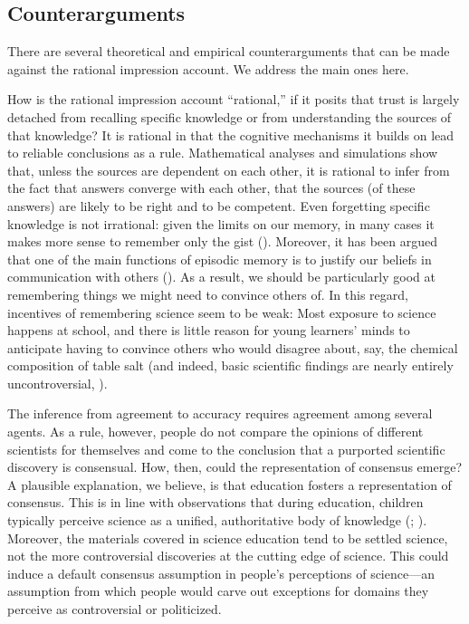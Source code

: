 \documentclass[
  jou,
  floatsintext,
  longtable,
  nolmodern,
  notxfonts,
  notimes,
  colorlinks=true,linkcolor=blue,citecolor=blue,urlcolor=blue]{apa7}
\begin{document}
\subsection{Counterarguments}\label{counterarguments}

There are several theoretical and empirical counterarguments that can be
made against the rational impression account. We address the main ones
here.

How is the rational impression account ``rational,'' if it posits that
trust is largely detached from recalling specific knowledge or from
understanding the sources of that knowledge? It is rational in that the
cognitive mechanisms it builds on lead to reliable conclusions as a
rule. Mathematical analyses and simulations show that, unless the
sources are dependent on each other, it is rational to infer from the
fact that answers converge with each other, that the sources (of these
answers) are likely to be right and to be competent. Even forgetting
specific knowledge is not irrational: given the limits on our memory, in
many cases it makes more sense to remember only the gist
(). Moreover,
it has been argued that one of the main functions of episodic memory is
to justify our beliefs in communication with others
(). As a
result, we should be particularly good at remembering things we might
need to convince others of. In this regard, incentives of remembering
science seem to be weak: Most exposure to science happens at school, and
there is little reason for young learners' minds to anticipate having to
convince others who would disagree about, say, the chemical composition
of table salt (and indeed, basic scientific findings are nearly entirely
uncontroversial,
).

The inference from agreement to accuracy requires agreement among
several agents. As a rule, however, people do not compare the opinions
of different scientists for themselves and come to the conclusion that a
purported scientific discovery is consensual. How, then, could the
representation of consensus emerge? A plausible explanation, we believe,
is that education fosters a representation of consensus. This is in line
with observations that during education, children typically perceive
science as a unified, authoritative body of knowledge
(; ). Moreover, the materials covered in science education tend to be
settled science, not the more controversial discoveries at the cutting
edge of science. This could induce a default consensus assumption in
people's perceptions of science---an assumption from which people would
carve out exceptions for domains they perceive as controversial or
politicized.
\end{document}
